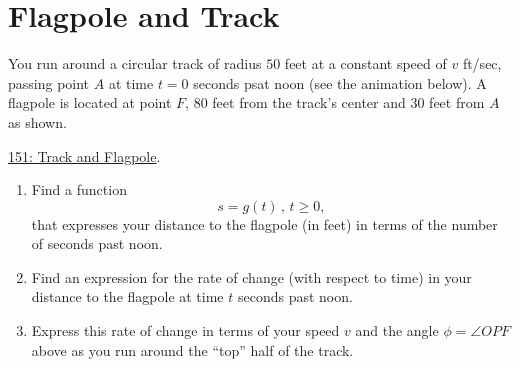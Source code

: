 \documentclass{ximera}
\begin{document}
\section{Flagpole and Track}


\begin{question} \label{QPEErmE}

You run around a circular track of radius $50$ feet at a constant speed of $v$ ft/sec, passing point $A$ at time $t=0$ seconds psat noon (see the animation below). A flagpole is located at point $F$, $80$ feet from the track's center and $30$ feet from $A$ as shown.


\href{https://www.desmos.com/calculator/xymelsnabl}{151: Track and Flagpole}.

 
\begin{onlineOnly}
    \begin{center}
\end{center}
\end{onlineOnly}

\begin{enumerate}
\item Find a function
\[
  s =g(t) \, , \, t\geq 0 ,
\]
that expresses your distance to the flagpole (in feet) in terms of the number of seconds past noon.

\item Find an expression for the rate of change (with respect to time) in your distance to the flagpole at time $t$ seconds past noon.

\item Express this rate of change in terms of your speed $v$ and the angle $\phi = \angle OPF$ above as you run around the ``top'' half of the track.


\end{enumerate}

\end{question}
\end{document}
